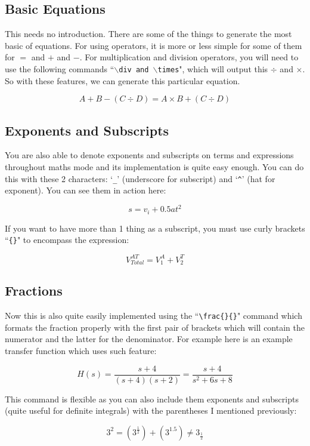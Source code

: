 \documentclass[12pt, a4paper]{article}
\begin{document}
			\subsection{Basic Equations}
				This needs no introduction. There are some of the things to generate the most basic of equations.
				For using operators, it is more or less simple for some of them for $=$ and $+$ and $-$. For multiplication and division
				operators, you will need to use the following commands ``\texttt{$\backslash$div and $\backslash$times}", which will output 
				this $\div$ and $\times$. So with these features, we can generate this particular equation.

				$$ A + B - (C \div D) = A \times B + (C \div D)$$

			\subsection{Exponents and Subscripts}
				You are also able to denote exponents and subscripts on terms and expressions throughout maths mode and its implementation is quite easy enough.
				You can do this with these 2 characters: `\verb|_|' (underscore for subscript) and `\verb|^|' (hat for exponent). You can see them in action here:
				
				$$ s = v_i + 0.5at^2$$
				
				If you want to have more than 1 thing as a subscript, you must use curly brackets ``\verb|{}|" to encompass the expression:
				
				$$V^{AT}_{Total} = V^A_1 + V^T_2$$
				
			\newpage
			\subsection{Fractions}
				Now this is also quite easily implemented using the ``\verb|\frac{}{}|" command which formats the fraction properly with the first pair of brackets which will contain the numerator and the latter for the denominator. For example here is an example transfer function which uses such feature:
				
				$$H(s) = \frac{s+4}{(s+4)(s+2)} = \frac{s+4}{s^2 + 6s + 8}$$
				
				This command is flexible as you can also include them exponents and subscripts (quite useful for definite integrals) with the parentheses I mentioned previously:
				
				$$3^2 = (3^{\frac{1}{2}}) + (3^{1.5}) \neq 3_{\frac{1}{2}}$$
				
\end{document}
